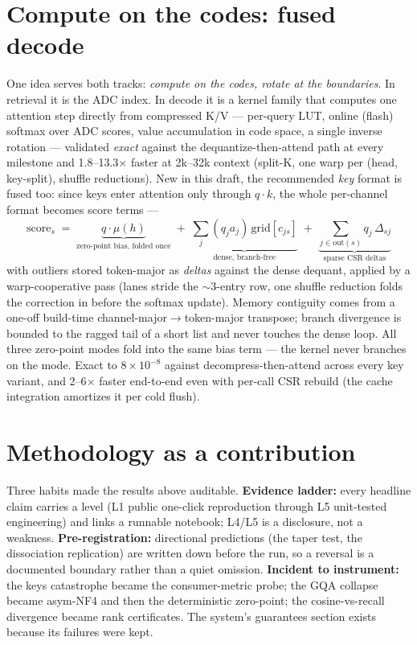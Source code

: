 \documentclass[11pt]{article}
\begin{document}
\section{Compute on the codes: fused decode}\label{sec:fused}
One idea serves both tracks: \emph{compute on the codes, rotate at the
boundaries}. In retrieval it is the ADC index. In decode it is a kernel
family that computes one attention step directly from compressed K/V ---
per-query LUT, online (flash) softmax over ADC scores, value accumulation in
code space, a single inverse rotation --- validated \emph{exact} against the
dequantize-then-attend path at every milestone and 1.8--13.3$\times$ faster
at 2k--32k context (split-K, one warp per (head, key-split), shuffle
reductions). New in this draft, the recommended \emph{key} format is fused
too: since keys enter attention only through $q\cdot k$, the whole
per-channel format becomes score terms ---
\[
\text{score}_s \;=\; \underbrace{q\cdot\mu(h)}_{\text{zero-point bias, folded once}}
\;+\; \underbrace{\textstyle\sum_j (q_j a_j)\,\mathrm{grid}[c_{js}]}_{\text{dense, branch-free}}
\;+\; \underbrace{\textstyle\sum_{j\in\mathrm{out}(s)} q_j\,\Delta_{sj}}_{\text{sparse CSR deltas}}
\]
with outliers stored token-major as \emph{deltas} against the dense dequant,
applied by a warp-cooperative pass (lanes stride the $\sim$3-entry row, one
shuffle reduction folds the correction in before the softmax update). Memory
contiguity comes from a one-off build-time channel-major$\to$token-major
transpose; branch divergence is bounded to the ragged tail of a short list
and never touches the dense loop. All three zero-point modes fold into the
same bias term --- the kernel never branches on the mode. Exact to
$8{\times}10^{-8}$ against decompress-then-attend across every key variant,
and 2--6$\times$ faster end-to-end even with per-call CSR rebuild (the cache
integration amortizes it per cold flush).

\section{Methodology as a contribution}\label{sec:method}
Three habits made the results above auditable. \textbf{Evidence ladder:}
every headline claim carries a level (L1 public one-click reproduction
through L5 unit-tested engineering) and links a runnable notebook; L4/L5 is
a disclosure, not a weakness. \textbf{Pre-registration:} directional
predictions (the taper test, the dissociation replication) are written down
before the run, so a reversal is a documented boundary rather than a quiet
omission. \textbf{Incident to instrument:} the keys catastrophe became the
consumer-metric probe; the GQA collapse became asym-NF4 and then the
deterministic zero-point; the cosine-vs-recall divergence became rank
certificates. The system's guarantees section exists because its failures
were kept.
\end{document}
